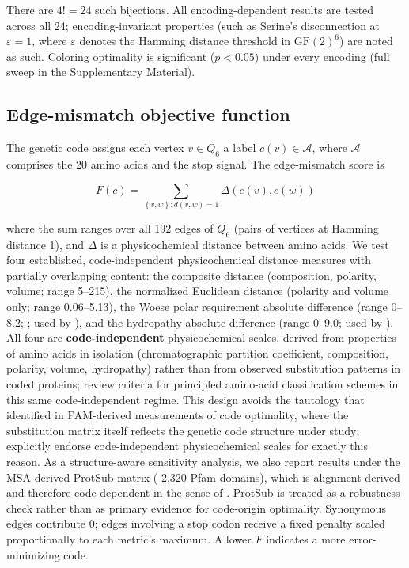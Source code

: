 \documentclass[preprint,11pt,authoryear,a4paper]{elsarticle}
\begin{document}
There are \(4! = 24\) such bijections. All encoding-dependent results
are tested across all 24; encoding-invariant properties (such as
Serine's disconnection at \(\varepsilon = 1\), where \(\varepsilon\)
denotes the Hamming distance threshold in \({\text{GF}(2)}^{6}\)) are
noted as such. Coloring optimality is significant (\(p < 0.05\)) under
every encoding (full sweep in the Supplementary Material).

\subsection{Edge-mismatch objective function}\label{sec:objective}

The genetic code assigns each vertex \(v \in Q_{6}\) a label
\(c(v) \in \mathcal{A}\), where \(\mathcal{A}\) comprises the 20 amino
acids and the stop signal. The edge-mismatch score is

\[F(c) = \sum_{\left\{ v,w \right\}:d(v,w) = 1}\Delta(c(v),c(w))\]
\protect{}\label{eq:mismatch}{}

where the sum ranges over all 192 edges of \(Q_{6}\) (pairs of vertices
at Hamming distance 1), and \(\Delta\) is a physicochemical distance
between amino acids. We test four established, code-independent
physicochemical distance measures with partially overlapping content:
the \citep{grantham1974} composite distance (composition, polarity,
volume; range 5--215), the \citep{miyata1979} normalized Euclidean
distance (polarity and volume only; range 0.06--5.13), the Woese polar
requirement absolute difference (range 0--8.2;
\citep{woese1966, woese1973}; used by \citep{freeland1998}), and the
\citep{kyte1982} hydropathy absolute difference (range 0--9.0; used by
\citep{haig1991}). All four are \textbf{code-independent}
physicochemical scales, derived from properties of amino acids in
isolation (chromatographic partition coefficient, composition, polarity,
volume, hydropathy) rather than from observed substitution patterns in
coded proteins; \citep{kosiol2004} review criteria for principled
amino-acid classification schemes in this same code-independent regime.
This design avoids the tautology that \citep{digiulio2001} identified in
PAM-derived measurements of code optimality, where the substitution
matrix itself reflects the genetic code structure under study;
\citep{koonin2009} explicitly endorse code-independent physicochemical
scales for exactly this reason. As a structure-aware sensitivity
analysis, we also report results under the MSA-derived ProtSub matrix
(\citep{jia2021} 2,320 Pfam domains), which is alignment-derived and
therefore code-dependent in the sense of \citep{digiulio2001}. ProtSub
is treated as a robustness check rather than as primary evidence for
code-origin optimality. Synonymous edges contribute 0; edges involving a
stop codon receive a fixed penalty scaled proportionally to each
metric's maximum. A lower \(F\) indicates a more error-minimizing code.
\end{document}
